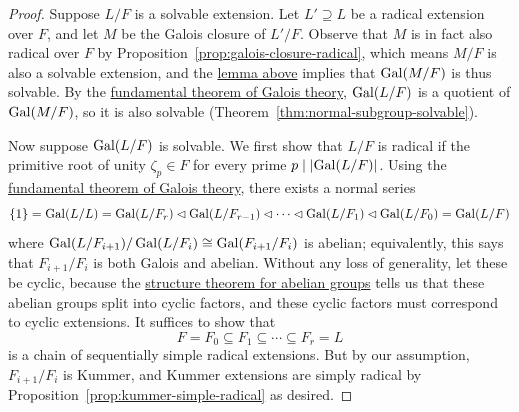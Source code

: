 \begin{proof}
    Suppose \(L/F\) is a solvable extension.
    Let \(L' \supseteq L\) be a radical extension over \(F\),
    and let \(M\) be the Galois closure of \(L'/F\).
    Observe that \(M\) is in fact also radical over \(F\) by Proposition~\ref{prop:galois-closure-radical},
    which means \(M/F\) is also a solvable extension,
    and the \hyperref[lem:solvable-properties]{lemma above} implies that \(\operatorname{Gal}(M/F)\) is thus solvable.
    By the \hyperref[thm:ftgt]{fundamental theorem of Galois theory},
    \(\operatorname{Gal}(L/F)\) is a quotient of \(\operatorname{Gal}(M/F)\),
    so it is also solvable (Theorem~\ref{thm:normal-subgroup-solvable}).

    Now suppose \(\operatorname{Gal}(L/F)\) is solvable.
    We first show that \(L/F\) is radical
    if the primitive root of unity \(\zeta_p \in F\) for every prime \(p \mid \abs{\operatorname{Gal}(L/F)}\).
    Using the \hyperref[thm:ftgt]{fundamental theorem of Galois theory}, there exists a normal series
    \begin{equation*}
        \{1\} = \operatorname{Gal}(L/L) = \operatorname{Gal}(L/F_r) \lhd \operatorname{Gal}(L/F_{r-1}) \lhd \cdots \lhd \operatorname{Gal}(L/F_1) \lhd \operatorname{Gal}(L/F_0) = \operatorname{Gal}(L/F)
    \end{equation*}
    where \(\operatorname{Gal}(L/F_{i+1})/\operatorname{Gal}(L/F_i) \cong \operatorname{Gal}(F_{i+1}/F_i)\) is abelian;
    equivalently, this says that \(F_{i+1}/F_i\) is both Galois and abelian.
    Without any loss of generality, let these be cyclic,
    because the \hyperref[thm:structure-divisor]{structure theorem for abelian groups}
    tells us that these abelian groups split into cyclic factors,
    and these cyclic factors must correspond to cyclic extensions.
    It suffices to show that
    \[F = F_0 \subseteq F_1 \subseteq \cdots \subseteq F_r = L\]
    is a chain of sequentially simple radical extensions.
    But by our assumption, \(F_{i+1}/F_i\) is Kummer,
    and Kummer extensions are simply radical by Proposition~\ref{prop:kummer-simple-radical} as desired.


\end{proof}
